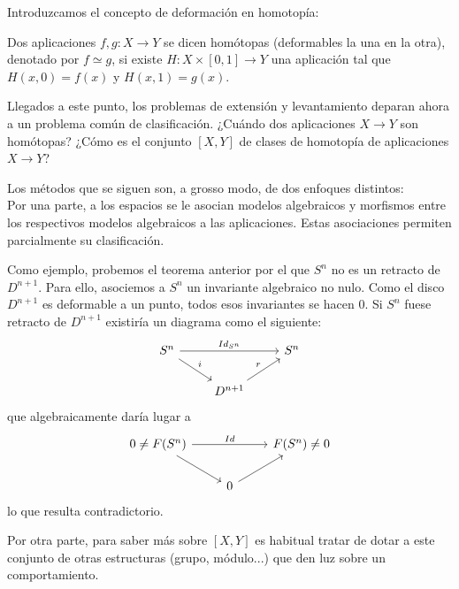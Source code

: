 Introduzcamos el concepto de deformación en homotopía:
\begin{defin}
Dos aplicaciones $f, g : X \rightarrow Y$ se dicen homótopas (deformables la una en la otra), denotado por $f \simeq g$, si existe  $H : X \times [0,1] \rightarrow Y$ una aplicación tal que $H(x ,0) = f(x)$ y $H(x, 1) = g(x)$.
\end{defin}
Llegados a este punto, los problemas de extensión y levantamiento deparan ahora a un problema común de clasificación. ¿Cuándo dos aplicaciones $X \rightarrow Y$ son homótopas? ¿Cómo es el conjunto $[X, Y]$ de clases de homotopía de aplicaciones $X \rightarrow Y$? \par 
Los métodos que se siguen son, a grosso modo, de dos enfoques distintos:\\
Por una parte, a los espacios se le asocian modelos algebraicos y morfismos entre los respectivos modelos algebraicos a las aplicaciones. Estas asociaciones permiten parcialmente su clasificación. \par 
Como ejemplo, probemos el teorema anterior por el que $S^n$ no es un retracto de $D^{n+1}$. Para ello, asociemos a $S^n$ un invariante algebraico no nulo. Como el disco $D^{n+1}$ es deformable a un punto, todos esos invariantes se hacen 0. Si $S^n$ fuese retracto de $D^{n+1}$ existiría un diagrama como el siguiente:
$$
\begin{tikzcd}
	S^n \arrow{rr}{Id_{S^n}} \drar{i} & & S^n \\
		&	D^{n+1} \urar{r} & 
\end{tikzcd}
$$
que algebraicamente daría lugar a 
$$
\begin{tikzcd}
	0 \neq F(S^n) \arrow{rr}{Id} \drar & &  F(S^n) \neq 0 \\
		&	0 \urar & 
\end{tikzcd}
$$
lo que resulta contradictorio. \par

Por otra parte, para saber más sobre $[X, Y]$ es habitual tratar de dotar a este conjunto de otras estructuras (grupo, módulo...) que den luz sobre un comportamiento. \par 



